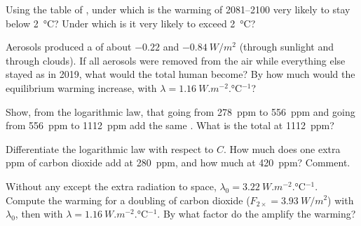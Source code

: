 \begin{exercise}[$\star\star$]\label{exo:g12:climate-change:11}
Using the table of , under which  is the warming of
2081--2100 very likely to stay below \qty{2}{\degreeCelsius}? Under which is
it very likely to exceed \qty{2}{\degreeCelsius}?
\end{exercise}

\begin{exercise}[$\star\star\star$]\label{exo:g12:climate-change:12}
Aerosols produced a  of about $-0.22$ and $\qty{-0.84}{W/m^2}$
(through sunlight and through clouds). If all aerosols were removed from the
air while everything else stayed as in 2019, what would the total human
 become? By how much would the equilibrium warming increase, with
$\lambda = \qty{1.16}{W.m^{-2}.\degreeCelsius^{-1}}$?
\end{exercise}

\begin{exercise}[$\star\star\star$]\label{exo:g12:climate-change:13}
Show, from the logarithmic law, that going from \qty{278}{ppm} to
\qty{556}{ppm} and going from \qty{556}{ppm} to \qty{1112}{ppm} add the same
. What is the total  at \qty{1112}{ppm}?
\end{exercise}

\begin{exercise}[$\star\star\star$]\label{exo:g12:climate-change:14}
Differentiate the logarithmic law with respect to $C$. How much  does
one extra ppm of carbon dioxide add at \qty{280}{ppm}, and how much at
\qty{420}{ppm}? Comment.
\end{exercise}

\begin{exercise}[$\star\star\star$]\label{exo:g12:climate-change:15}
Without any  except the extra radiation to space,
$\lambda_0 = \qty{3.22}{W.m^{-2}.\degreeCelsius^{-1}}$. Compute the warming
for a doubling of carbon dioxide ($F_{2\times} = \qty{3.93}{W/m^2}$) with
$\lambda_0$, then with $\lambda = \qty{1.16}{W.m^{-2}.\degreeCelsius^{-1}}$. By
what factor do the  amplify the warming?
\end{exercise}

